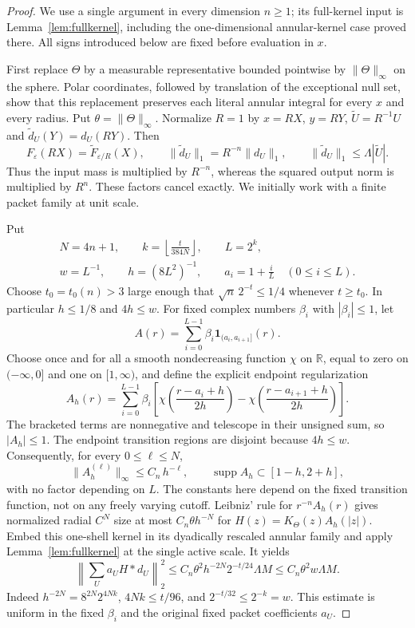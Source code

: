 \documentclass[11pt]{article}
\numberwithin{equation}{section}
\theoremstyle{remark}
\theoremstyle{definition}
\newcommand{\supp}{\operatorname{supp}}
\newcommand{\norm}[1]{\lVert #1\rVert}
\begin{document}
\begin{proof}
We use a single argument in every dimension $n\ge1$; its full-kernel
input is Lemma~\ref{lem:fullkernel}, including the one-dimensional
annular-kernel case proved there.  All signs introduced below are fixed
before evaluation in $x$.

First replace $\Theta$ by a measurable representative bounded pointwise
by $\norm\Theta_\infty$ on the sphere.  Polar coordinates, followed by
translation of the exceptional null set, show that this replacement
preserves each literal annular integral for every $x$ and every radius.
Put $\theta=\norm\Theta_\infty$.  Normalize $R=1$ by
$x=RX$, $y=RY$, $\widetilde U=R^{-1}U$ and
$\widetilde d_U(Y)=d_U(RY)$.  Then
\[
 F_\varepsilon(RX)=\widetilde F_{\varepsilon/R}(X),\qquad
 \norm{\widetilde d_U}_1=R^{-n}\norm{d_U}_1,\qquad
 \norm{\widetilde d_U}_1\le\Lambda|\widetilde U|.
\]
Thus the input mass is multiplied by $R^{-n}$, whereas the squared
output norm is multiplied by $R^n$.  These factors cancel exactly.
We initially work with a finite packet family at unit scale.

Put
\[
 \begin{gathered}
 N=4n+1,\qquad k=\left\lfloor\frac{t}{384N}\right\rfloor,
 \qquad L=2^k,\\
 w=L^{-1},\qquad h=(8L^2)^{-1},\qquad
 a_i=1+\frac{i}{L}\quad(0\le i\le L).
 \end{gathered}
\]
Choose $t_0=t_0(n)>3$ large enough that
$\sqrt n\,2^{-t}\le1/4$ whenever $t\ge t_0$.
In particular $h\le1/8$ and $4h\le w$.
For fixed complex numbers $\beta_i$ with $|\beta_i|\le1$, let
\[
 A(r)=\sum_{i=0}^{L-1}\beta_i\mathbf1_{(a_i,a_{i+1}]}(r).
\]
Choose once and for all a smooth nondecreasing function $\chi$ on
$\mathbb R$, equal to zero on $(-\infty,0]$ and one on $[1,\infty)$,
and define the explicit endpoint regularization
\[
 A_h(r)=\sum_{i=0}^{L-1}\beta_i
 \left[\chi\!\left(\frac{r-a_i+h}{2h}\right)
       -\chi\!\left(\frac{r-a_{i+1}+h}{2h}\right)\right].
\]
The bracketed terms are nonnegative and telescope in their unsigned
sum, so $|A_h|\le1$.  The endpoint transition regions are disjoint
because $4h\le w$.  Consequently, for every $0\le\ell\le N$,
\[
 \norm{A_h^{(\ell)}}_\infty\le C_{n}\,h^{-\ell},
 \qquad \supp A_h\subset[1-h,2+h],
\]
with no factor depending on $L$.  The constants here depend on the
fixed transition function, not on any freely varying cutoff.
Leibniz' rule for $r^{-n}A_h(r)$ gives normalized radial $C^N$ size
at most $C_n\theta h^{-N}$ for $H(z)=K_\Theta(z)A_h(|z|)$.
Embed this one-shell kernel in its dyadically rescaled annular family
and apply Lemma~\ref{lem:fullkernel} at the single active scale.  It yields
\[
 \left\|\sum_U a_U H*d_U\right\|_2^2
 \le C_n\theta^2h^{-2N}2^{-t/24}\Lambda M
 \le C_n\theta^2w\Lambda M.
\]
Indeed $h^{-2N}=8^{2N}2^{4Nk}$, $4Nk\le t/96$, and
$2^{-t/32}\le2^{-k}=w$.  This estimate is uniform in the fixed
$\beta_i$ and the original fixed packet coefficients $a_U$.


\end{proof}
\end{document}
